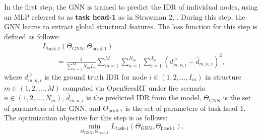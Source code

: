 In the first step, the GNN is trained to predict the IDR of individual nodes, using an MLP referred to as {\bf{task head-1}} as in Strawman 2, . During this step, the GNN learns to extract global structural features. The loss function for this step is defined as follows:
\begin{equation}
    \label{eq:mdr_loss_task1}
    \begin{aligned}
        & L_{\text{task-1}}\left(\Theta_{\text{GNN}}, \Theta_{\text{head-1}}\right)\\
        & \qquad=\frac{1}{\sum_{m=1}^{M} N_{m} I_{m}}\sum_{m=1}^{M} \sum_{n=1}^{N_{m}} \sum_{i=1}^{I_{m}} \left( d_{m,n,i}^{\, \gt} - \widehat{d}_{m,n,i} \right)^2,
    \end{aligned}
\end{equation}  
where $d_{m,n,i}^{\, \gt}$ is the ground truth IDR for node $i \in \left(1,2,\dots,I_{m}\right)$ in structure $m \in (1,2,\dots,M)$ computed via OpenSeesRT under fire scenario $n \in \left(1,2,\dots,N_{m}\right)$, $\widehat{d}_{m,n,i}$ is the predicted IDR from the model, $\Theta_{\text{GNN}}$ is the set of parameters of the GNN, and $\Theta_{\text{head-1}}$ is the set of parameters of task head-1. The optimization objective for this step is as follows:  
\begin{equation}
    \label{eq:mdr_task1}
    \min_{\Theta_{\text{GNN}}, \Theta_{\text{head-1}}} L_{\text{task-1}}\left(\Theta_{\text{GNN}}, \Theta_{\text{head-1}}\right).
\end{equation}  

